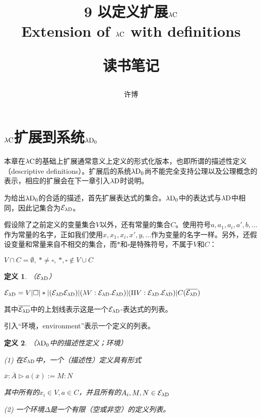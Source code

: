 \documentclass[UTF8]{article}
\title{9 以定义扩展$\lambda{\rm C}$\\Extension of $\lambda{\rm C}$ with definitions\\[2ex]\begin{large}读书笔记\end{large}}
\author{许博}
\date{}
\newtheorem{thm}{定义}[section]
\begin{document}
\maketitle
	\section{$\lambda{\rm C}$扩展到系统$\lambda{\rm D_0}$}
	\noindent
	本章在$\lambda{\rm C}$的基础上扩展通常意义上定义的形式化版本，也即所谓的描述性定义（descriptive definitions）。扩展后的系统$\lambda{\rm D_0}$尚不能完全支持公理以及公理概念的表示，相应的扩展会在下一章引入$\lambda{\rm D}$时说明。
	
		为给出$\lambda{\rm D_0}$的合适的描述，首先扩展表达式的集合。$\lambda{\rm D_0}$中的表达式与$\lambda{\rm D}$中相同，因此记集合为$\mathcal{E}_{\lambda{\rm D}}$。
		
		假设除了之前定义的变量集合$V$以外，还有常量的集合$C$。使用符号$a,a_1,a_i,a',b,...$作为常量的名字，正如我们使用$x,x_1,x_i,x',y,...$作为变量的名字一样。另外，还假设变量和常量来自不相交的集合，而$*$和$\square$是特殊符号，不属于$V$和$C$：
		
		$V\cap C=\emptyset,\ *\not=\square,\ *,\square\notin V\cup C$
		
		\begin{thm}（$\mathcal{E}_{\lambda{\rm D}}$）
			
			$\mathcal{E}_{\lambda{\rm D}}=V|\square|*|(\mathcal{E}_{\lambda{\rm D}}\mathcal{E}_{\lambda{\rm D}})|(\lambda V:\mathcal{E}_{\lambda{\rm D}}.\mathcal{E}_{\lambda{\rm D}})|(\Pi V:\mathcal{E}_{\lambda{\rm D}}.\mathcal{E}_{\lambda{\rm D}})|C(\overline{\mathcal{E}_{\lambda{\rm D}}})$
		\end{thm}
	
		其中$\overline{\mathcal{E}_{\lambda{\rm D}}}$中的上划线表示这是一个$\mathcal{E}_{\lambda{\rm D}}$-表达式的列表。
		
		引入“环境，environment”表示一个定义的列表。
		
		\begin{thm}（$\lambda{\rm D_0}$中的描述性定义；环境）
			
			\noindent
			(1) 在$\mathcal{E}_{\lambda{\rm D}}$中，一个（描述性）定义具有形式
			
			$\overline{x}:\overline{A}\triangleright a(\overline{x}):=M:N$
			
			\noindent
			其中所有的$x_i\in V,a\in C$，并且所有的$A_i,M,N\in\mathcal{E}_{\lambda{\rm D}}$
			
			\noindent
			(2) 一个环境$\Delta$是一个有限（空或非空）的定义列表。
		\end{thm}
	
\end{document}
